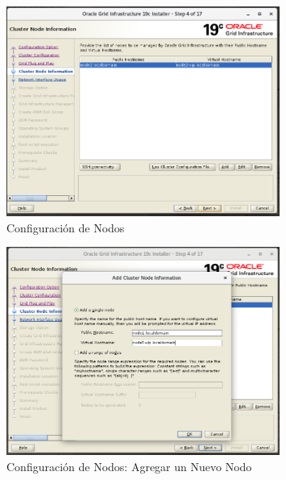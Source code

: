 \documentclass{article}
\begin{document}
\begin{figure}[H]
		\begin{center}
			\includegraphics[width=0.80\textwidth]{grid_install_04_cluster_node_information.png}
		\end{center}
		\caption{Configuración de Nodos}
\end{figure}

\begin{figure}[H]
		\begin{center}
			\includegraphics[width=0.80\textwidth]{grid_install_04_01_cluster_node_information_add_node.png}
		\end{center}
		\caption{Configuración de Nodos: Agregar un Nuevo Nodo}
\end{figure}
\end{document}
